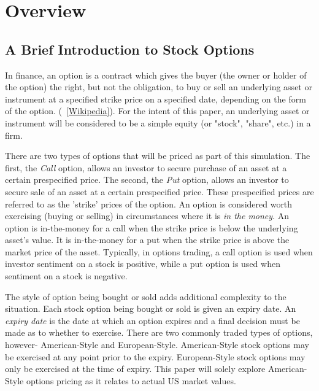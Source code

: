 
\chapter{Overview}
\section{A Brief Introduction to Stock Options} %

In finance, an option is a contract which gives the buyer (the owner or holder of the option) the right, but not the obligation, to buy or sell an underlying asset or instrument at a specified strike price on a specified date, depending on the form of the option. (~\ref{Wikipedia}). For the intent of this paper, an underlying asset or instrument will be considered to be a simple equity (or "stock", "share", etc.) in a firm. 

There are two types of options that will be priced as part of this simulation. The first, the \textit{Call} option, allows an investor to secure purchase of an asset at a certain prespecified price. The second, the \textit{Put} option, allows an investor to secure sale of an asset at a certain prespecified price. These prespecified prices are referred to as the 'strike' prices of the option. An option is considered worth exercising (buying or selling) in circumstances where it is \textit{in the money}. An option is in-the-money for a call when the strike price is below the underlying asset's value. It is in-the-money for a put when the strike price is above the market price of the asset. Typically, in options trading, a call option is used when investor sentiment on a stock is positive, while a put option is used when sentiment on a stock is negative. 

The style of option being bought or sold adds additional complexity to the situation. Each stock option being bought or sold is given an expiry date. An \textit{expiry date} is the date at which an option expires and a final decision must be made as to whether to exercise. There are two commonly traded types of options, however- American-Style and European-Style. American-Style stock options may be exercised at any point prior to the expiry. European-Style stock options may only be exercised at the time of expiry. This paper will solely explore American-Style options pricing as it relates to actual US market values.

